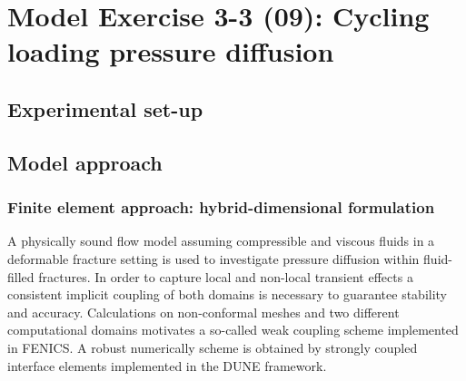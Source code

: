 \section{Model Exercise 3-3 (09): Cycling loading pressure diffusion}
\label{sec:mex09}
\subsection{Experimental set-up}
\subsection{Model approach}
\subsubsection*{Finite element approach: hybrid-dimensional formulation}
A physically sound flow model assuming compressible and viscous fluids in a deformable fracture setting is used to investigate pressure diffusion within fluid-filled fractures. In order to capture local and non-local transient effects a consistent implicit coupling of both domains is necessary to guarantee stability and accuracy. Calculations on non-conformal meshes and two different computational domains motivates a so-called weak coupling scheme implemented in FENICS. A robust numerically scheme is obtained by strongly coupled interface elements implemented in the DUNE framework. 
